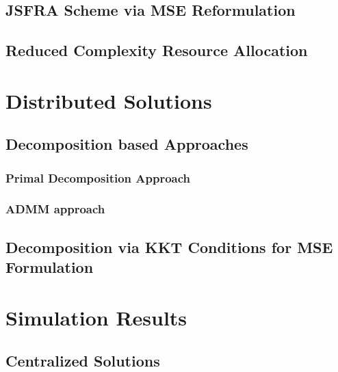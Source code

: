 \documentclass[10pt,final,twocolumn,letterpaper]{./../Styles/IEEEtran}
\begin{document}
\subsection{\ac{JSFRA} Scheme via \ac{MSE} Reformulation} \label{sec-3.3}


\subsection{Reduced Complexity Resource Allocation} \label{sec-3.4}


\section{Distributed Solutions} \label{sec-4}



\subsection{Decomposition based Approaches} \label{sec-4a}

\subsubsection{Primal Decomposition Approach} \label{sec-4.1}


%

\subsubsection{\ac{ADMM} approach} \label{sec-4.2}


%

\subsection{Decomposition via \ac{KKT} Conditions for \ac{MSE} Formulation} \label{sec-4.3}



\section{Simulation Results} \label{sec-5}


\subsection{Centralized Solutions}

\end{document}
